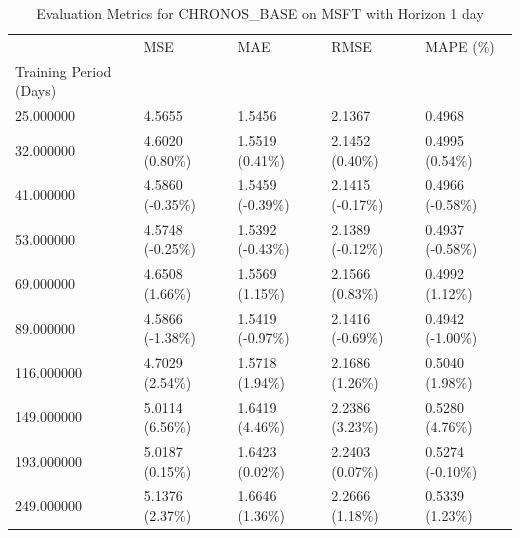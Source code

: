 \begin{table}
\caption{Evaluation Metrics for CHRONOS_BASE on MSFT with Horizon 1 day}
\label{tab:chronos_base_MSFT_h1_metrics}
\begin{tabular}{lllll}
\toprule
 & MSE & MAE & RMSE & MAPE (\%) \\
Training Period (Days) &  &  &  &  \\
\midrule
25.000000 & 4.5655 & 1.5456 & 2.1367 & 0.4968 \\
32.000000 & 4.6020 (0.80\%) & 1.5519 (0.41\%) & 2.1452 (0.40\%) & 0.4995 (0.54\%) \\
41.000000 & 4.5860 (-0.35\%) & 1.5459 (-0.39\%) & 2.1415 (-0.17\%) & 0.4966 (-0.58\%) \\
53.000000 & 4.5748 (-0.25\%) & 1.5392 (-0.43\%) & 2.1389 (-0.12\%) & 0.4937 (-0.58\%) \\
69.000000 & 4.6508 (1.66\%) & 1.5569 (1.15\%) & 2.1566 (0.83\%) & 0.4992 (1.12\%) \\
89.000000 & 4.5866 (-1.38\%) & 1.5419 (-0.97\%) & 2.1416 (-0.69\%) & 0.4942 (-1.00\%) \\
116.000000 & 4.7029 (2.54\%) & 1.5718 (1.94\%) & 2.1686 (1.26\%) & 0.5040 (1.98\%) \\
149.000000 & 5.0114 (6.56\%) & 1.6419 (4.46\%) & 2.2386 (3.23\%) & 0.5280 (4.76\%) \\
193.000000 & 5.0187 (0.15\%) & 1.6423 (0.02\%) & 2.2403 (0.07\%) & 0.5274 (-0.10\%) \\
249.000000 & 5.1376 (2.37\%) & 1.6646 (1.36\%) & 2.2666 (1.18\%) & 0.5339 (1.23\%) \\
\bottomrule
\end{tabular}
\end{table}
